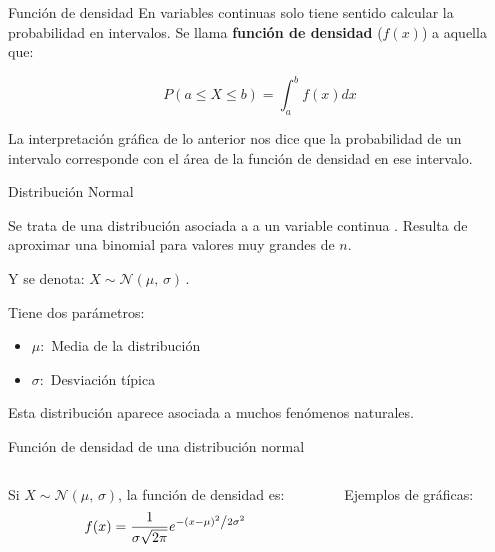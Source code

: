 \documentclass[11pt,handout]{beamer}
\begin{document}
\begin{frame}{Función de densidad}
En variables continuas solo tiene sentido calcular la probabilidad en intervalos.
Se llama \textbf{función de densidad} ($f(x)$) a aquella que: 
\begin{block}{}
$$P\left(a\leq X \leq b \right) = \int_{a}^{b} f(x) dx$$
\end{block}    


La interpretación gráfica de lo anterior nos dice que la probabilidad de un intervalo corresponde con el área de la función de densidad en ese intervalo.
\begin{center}


\end{center}
\end{frame}

\begin{frame}
{Distribución Normal}

Se trata de una distribución asociada a a un variable continua . Resulta de aproximar una binomial para valores muy grandes de $n$. 
\begin{block}{} Y se denota: $
X \sim \mathcal{N}(\mu,\,\sigma)\,.
    $ 
\end{block}
\pause
Tiene dos parámetros:
\begin{itemize} [<+->]
    \item $\mu :$ Media de la distribución
    \item $\sigma :$ Desviación típica
\end{itemize}

\pause    
Esta distribución aparece asociada a muchos fenómenos naturales. 
\end{frame}


\begin{frame}{Función de densidad de una distribución normal}  
\begin{columns}
\begin{column}{0.4\textwidth}
\begin{block}{}
Si $
X \sim \mathcal{N}(\mu,\,\sigma)
    $, la función de densidad es:
    $$f(x)=\frac{1}{{\sigma \sqrt {2\pi } }}e^{{{ - \left( {x - \mu } \right)^2 } \mathord{\left/ {\vphantom {{ - \left( {x - \mu } \right)^2 } {2\sigma ^2 }}} \right. \kern-\nulldelimiterspace} {2\sigma ^2 }}}$$
\end{block}
\end{column}
\begin{column}{0.6\textwidth} Ejemplos de gráficas:

\end{column}
\end{columns}{}

\end{frame}
\end{document}
